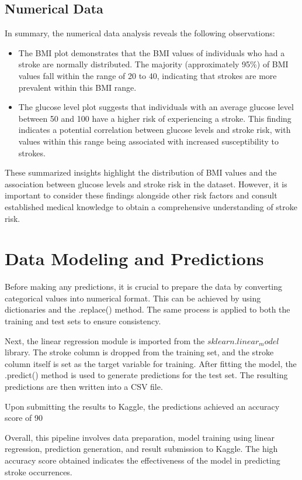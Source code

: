\documentclass{article}
\begin{document}
\subsection{Numerical Data}
In summary, the numerical data analysis reveals the following observations:

\begin{itemize}
  \item The BMI plot demonstrates that the BMI values of individuals who had a stroke are normally distributed. The majority (approximately 95\%) of BMI values fall within the range of 20 to 40, indicating that strokes are more prevalent within this BMI range.
  \item The glucose level plot suggests that individuals with an average glucose level between 50 and 100 have a higher risk of experiencing a stroke. This finding indicates a potential correlation between glucose levels and stroke risk, with values within this range being associated with increased susceptibility to strokes.
\end{itemize}

These summarized insights highlight the distribution of BMI values and the association between glucose levels and stroke risk in the dataset. However, it is important to consider these findings alongside other risk factors and consult established medical knowledge to obtain a comprehensive understanding of stroke risk.

\section{Data Modeling and Predictions}

Before making any predictions, it is crucial to prepare the data by converting categorical values into numerical format. This can be achieved by using dictionaries and the .replace() method. The same process is applied to both the training and test sets to ensure consistency.

Next, the linear regression module is imported from the $sklearn.linear_model$ library. The stroke column is dropped from the training set, and the stroke column itself is set as the target variable for training. After fitting the model, the .predict() method is used to generate predictions for the test set. The resulting predictions are then written into a CSV file.

Upon submitting the results to Kaggle, the predictions achieved an accuracy score of 90%

Overall, this pipeline involves data preparation, model training using linear regression, prediction generation, and result submission to Kaggle. The high accuracy score obtained indicates the effectiveness of the model in predicting stroke occurrences.
\end{document}
